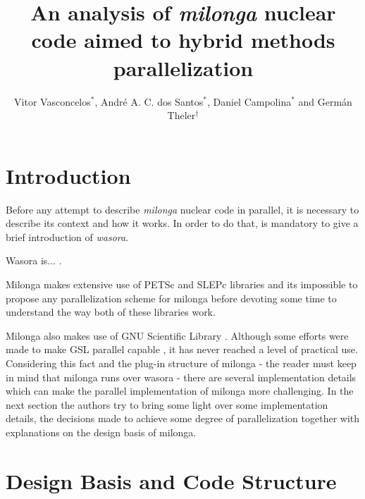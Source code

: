 \documentclass{anstrans}
\title{An analysis of \textit{milonga} nuclear code aimed to hybrid methods parallelization}
\author{Vitor Vasconcelos$^{*}$, Andr\'e A. C. dos Santos$^{*}$, Daniel Campolina$^{*}$ and Germ\'an Theler$^{\dagger}$}
\institute{
$^{*}$Centro de Desenvolvimento da Tecnologia Nuclear, CEP 31270-901,
Belo Horizonte - MG, Brazil
\and
$^{\dagger}$Seamplex, Rafaela, Argentina
}
\begin{document}
\vspace*{-42pt}
\begin{strip}
\vspace*{14pt}
\end{strip}


\section{Introduction}

Before any attempt to describe \textit{milonga} nuclear code in parallel, it is
necessary to describe its context and how it works. In order to do that, is mandatory
to give a brief introduction of \textit{wasora}.

Wasora is... \cite{wasora}.


Milonga makes extensive use of PETSc \cite{petsc} and SLEPc \cite{Hernandez2005} libraries and
its impossible to propose any parallelization scheme for milonga before devoting some
time to understand the way both of these libraries work.

Milonga also makes use of GNU Scientific Library \cite{gsl2016}. Although some efforts were made to make
GSL parallel capable \cite{Aliaga2004}, it has never reached a level of practical use. Considering
this fact and the plug-in structure of milonga - the reader must keep in mind that milonga runs
over wasora - there are several implementation details which can make the parallel implementation
of milonga more challenging. In the next section the authors try to bring some light over some
implementation details, the decisions made to achieve some degree of parallelization together with
explanations on the design basis of milonga.



\section{Design Basis and Code Structure}
\end{document}
